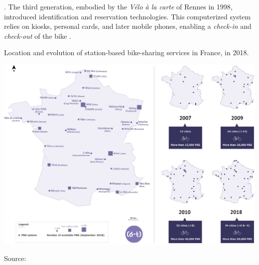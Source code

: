 \begin{refsegment}
{} \textcolor{blue}{\autocite[160]{shaheen_bikesharing_2010}}. The third generation, embodied by the \textsl{Vélo à la carte} of Rennes in 1998, introduced identification and reservation technologies. This computerized system relies on kiosks, personal cards, and later mobile phones, enabling a \textsl{check-in} and \textsl{check-out} of the bike \textcolor{blue}{\autocite[8]{nlc_micromobility_2019}}.%

\begin{carte}[h!]\vspace*{4pt}
    \caption{Location and evolution of station-based bike-sharing services in France, in 2018.}
    \label{fig-chap1:carte-vls-france}
    \centerline{\includegraphics[width=1\columnwidth]{src/Figures/Chap-1/EN_Carte_VLS_France.jpg}}
    \vspace{5pt}
    \begin{flushright}\scriptsize{
    Source: \textcolor{blue}{\textcite{6t-bureau_de_recherche_lechappee_2018}}
    }\end{flushright}
\end{carte}


\end{refsegment}

